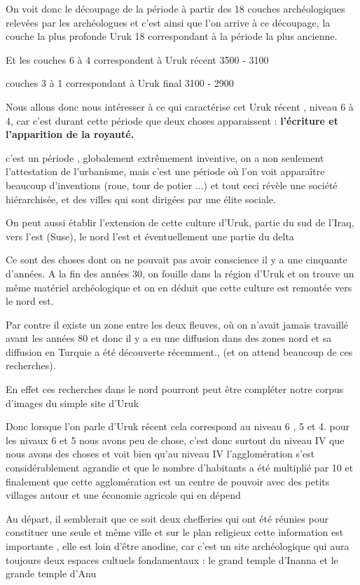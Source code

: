 \documentclass[a4paper,10pt]{article}
\begin{document}
\begin{itemize}
On voit donc le découpage de la période à partir des 18 couches
archéologiques relevées par les archéologues et c'est 
ainsi que l'on arrive à ce découpage, la couche la
plus profonde  Uruk 18 correspondant à la période la plus ancienne.

Et les couches 6 à 4 correspondent à Uruk récent  3500 - 3100

couches 3 à 1 correspondant à Uruk final 3100 - 2900 

Nous allons donc nous intéresser à ce qui caractérise cet Uruk récent ,
niveau 6 à 4, car c'est durant cette période que deux
choses apparaissent :  \textbf{l'écriture et
l'apparition de la royauté.}

c'est un période , globalement extrêmement inventive,
on a non seulement l'attestation de
l'urbanisme, mais c'est une période
où l'on voit apparaître beaucoup
d'inventions (roue, tour de potier ...) et tout ceci
révèle une société hiérarchisée, et des villes qui sont dirigées par
une élite sociale.

On peut aussi établir l'extension de cette culture
d'Uruk, partie du sud de l'Iraq, vers
l'est (Suse), le nord l'est et
éventuellement une partie du delta

Ce sont des choses dont on ne pouvait pas avoir conscience il y a une
cinquante d'années. A la fin des années 30, on fouille
dans la région d'Uruk et on trouve un même matériel
archéologique et on en déduit que cette culture est remontée vers le
nord est. 

Par contre il existe un zone entre les deux fleuves, où on
n'avait jamais travaillé avant les années 80 et donc
il y a eu une diffusion dans des zones nord et sa diffusion en Turquie
a été découverte récemment., (et on attend beaucoup de ces recherches).

En effet ces recherches dans le nord pourront peut être compléter notre
corpus d'images du simple site d'Uruk

Donc lorsque l'on parle d'Uruk récent
cela correspond au niveau 6 , 5 et 4. pour les nivaux 6 et 5 nous avons
peu de chose, c'est donc surtout du niveau IV que nous
avons des choses et voit bien qu'au niveau IV
l'agglomération s'est
considérablement agrandie et que le nombre d'habitants
a été multiplié par 10 et finalement que cette agglomération est un
centre de pouvoir avec des petits villages autour et une économie
agricole qui en dépend

Au départ, il semblerait que ce soit deux chefferies qui ont été réunies
pour constituer une seule et même ville et sur le plan religieux cette
information est importante , elle est loin d'être
anodine, car c'est un site archéologique qui aura
toujours deux espaces cultuels fondamentaux : le grand temple
d'Inanna  et le grande temple d'Anu


\end{itemize}
\end{document}
